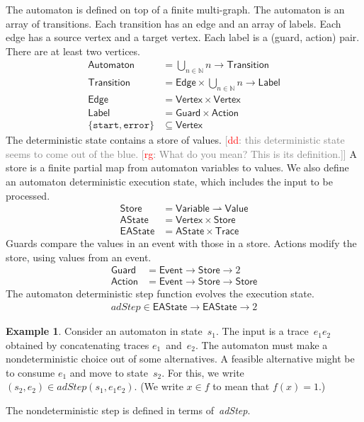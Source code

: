 \documentclass[preprint]{sigplanconf} %
\newcommand{\note}[2]{\textcolor{gray}{[\textcolor{red}{#1}: #2]}}
\newcommand{\rg}[1]{\note{rg}{#1}}
\newcommand{\dd}[1]{\note{dd}{#1}}
\newcommand{\dinocomment}[1]{\dd{#1}}
\newcommand{\N}{\ensuremath{\mathbb{N}}}
\newcommand{\pmap}{\rightharpoonup}
\newcommand{\set}[1]{\ensuremath{\mathsf{#1}}}
\theoremstyle{definition}
\newtheorem{example}{Example}
\begin{document}
The automaton is defined on top of a finite multi-graph.
The automaton is an array of transitions.
Each transition has an edge and an array of labels.
Each edge has a source vertex and a target vertex.
Each label is a (guard, action) pair.
There are at least two vertices.
\begin{align}
\set{Automaton} &= \bigcup_{n\in\N} n \to \set{Transition} \\
\set{Transition} &= \set{Edge}\times \bigcup_{n\in\N} n\to\set{Label} \\
\set{Edge}&=\set{Vertex}\times\set{Vertex} \\
\set{Label}&=\set{Guard}\times\set{Action} \\
\{\mathtt{start},\mathtt{error}\}&\subseteq\set{Vertex}
\end{align}
The deterministic state contains a store of values.
\dinocomment{this deterministic state seems to come out of the blue.
\rg{What do you mean?
This is its definition.}}
A store is a finite partial map from automaton variables to values.
We also define an automaton deterministic execution state, which includes the input to be processed.
\begin{align}
\set{Store}&=\set{Variable}\pmap\set{Value} \\
\set{AState}&=\set{Vertex}\times\set{Store} \\
\set{EAState}&=\set{AState}\times\set{Trace}
\end{align}
Guards compare the values in an event with those in a store.
Actions modify the store, using values from an event.
\begin{align}
\set{Guard}&=\set{Event}\to\set{Store}\to2 \\
\set{Action}&=\set{Event}\to\set{Store}\to\set{Store}
\end{align}
The automaton deterministic step function evolves the execution state.
\begin{align}
\mathit{adStep}\in\set{EAState}\to\set{EAState}\to2
\end{align}
\begin{example}
Consider an automaton in state~$s_1$.
The input is a trace~$e_1e_2$ obtained by concatenating traces $e_1$~and~$e_2$.
The automaton must make a nondeterministic choice out of some alternatives.
A feasible alternative might be to consume $e_1$ and move to state~$s_2$.
For this, we write $(s_2,e_2)\in\mathit{adStep}(s_1,e_1e_2)$.
(We write $x\in f$ to mean that $f(x)=1$.)
\end{example}
The nondeterministic step is defined in terms of~\textit{adStep}.
\end{document}
